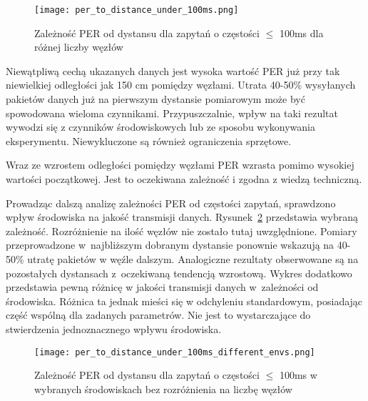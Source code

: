 \begin{figure}[!htb]
	\centering \texttt{[image: per\_to\_distance\_under\_100ms.png]}
	\caption{Zależność \gls{PER} od dystansu dla zapytań o częstości $\leqslant$ 100ms dla różnej liczby węzłów}
	\label{rys:per_to_distance_under_100ms}
\end{figure}

Niewątpliwą cechą ukazanych danych jest wysoka wartość PER już przy tak niewielkiej odległości jak 150 cm pomiędzy węzłami.
Utrata 40-50\% wysyłanych pakietów danych już na pierwszym dystansie pomiarowym może być spowodowana wieloma czynnikami.
Przypuszczalnie, wpływ na taki rezultat wywodzi się z czynników środowiskowych lub ze sposobu wykonywania 
eksperymentu. Niewykluczone są również ograniczenia sprzętowe.

Wraz ze wzrostem odległości pomiędzy węzłami PER wzrasta pomimo wysokiej wartości początkowej. Jest to 
oczekiwana zależność i zgodna z wiedzą techniczną.

Prowadząc dalszą analizę zależności PER od częstości zapytań, sprawdzono wpływ środowiska na jakość transmisji danych.
Rysunek~\ref{rys:per_to_distance_under_100ms_different_envs} przedstawia wybraną zależność. Rozróżnienie
na ilość węzłów nie zostało tutaj uwzględnione. Pomiary przeprowadzone w~najbliższym dobranym dystansie ponownie 
wskazują na 40-50\% utratę pakietów w węźle dalszym. Analogiczne rezultaty obserwowane są na pozostałych dystansach 
z~oczekiwaną tendencją wzrostową.
Wykres dodatkowo przedstawia pewną różnicę w jakości transmisji danych w~zależności od środowiska. Różnica ta 
jednak mieści się w odchyleniu standardowym, posiadając część wspólną dla zadanych parametrów. Nie jest to 
wystarczające do stwierdzenia jednoznacznego wpływu środowiska.

\begin{figure}[!htb]
	\centering \texttt{[image: per\_to\_distance\_under\_100ms\_different\_envs.png]} 
	\caption{Zależność \gls{PER} od dystansu dla zapytań o częstości $\leqslant$ 100ms w wybranych środowiskach bez rozróżnienia na liczbę węzłów}
	\label{rys:per_to_distance_under_100ms_different_envs}
\end{figure}

